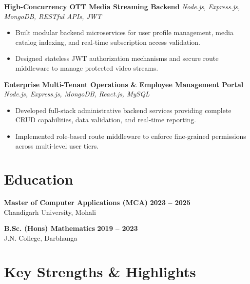 \documentclass[a4paper,10pt]{article}
\begin{document}
\textbf{High-Concurrency OTT Media Streaming Backend}
\hfill
\textit{Node.js, Express.js, MongoDB, RESTful APIs, JWT}

\begin{itemize}

    \item Built modular backend microservices for user profile management, media catalog indexing, and real-time subscription access validation.

    \item Designed stateless JWT authorization mechanisms and secure route middleware to manage protected video streams.

\end{itemize}


\textbf{Enterprise Multi-Tenant Operations \& Employee Management Portal}
\hfill
\textit{Node.js, Express.js, MongoDB, React.js, MySQL}

\begin{itemize}

    \item Developed full-stack administrative backend services providing complete CRUD capabilities, data validation, and real-time reporting.

    \item Implemented role-based route middleware to enforce fine-grained permissions across multi-level user tiers.

\end{itemize}

\section*{Education}

\textbf{Master of Computer Applications (MCA)}
\hfill
\textbf{2023 -- 2025}
\\
Chandigarh University, Mohali

\vspace{3pt}

\textbf{B.Sc. (Hons) Mathematics}
\hfill
\textbf{2019 -- 2023}
\\
J.N. College, Darbhanga

\section*{Key Strengths \& Highlights}
\end{document}
